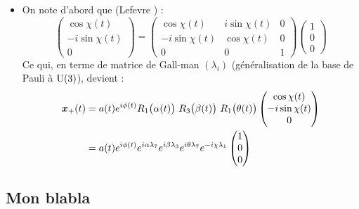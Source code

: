 \begin{itemize}
	\item On note d'abord que (Lefevre \cite{lefevre_polarization_2021}) :
	\[\begin{pmatrix}
		\cos\chi(t) \\ -i\sin\chi(t) \\ 0
	\end{pmatrix} = \begin{pmatrix}
		\cos\chi(t) & i\sin\chi(t) & 0 \\ -i\sin\chi(t) & \cos\chi(t) & 0 \\ 0 & 0 & 1
	\end{pmatrix}\begin{pmatrix}
		1 \\ 0 \\ 0
	\end{pmatrix}\]
	Ce qui, en terme de matrice de Gall-man $(\lambda_i)$ (généralisation de la base de Pauli à $\text{\normalfont U}(3)$), devient :
	\begin{align*}
		\sa{\bf{x}}(t) &= a(t)e^{i\phi(t)} R_1\big(\alpha(t)\big)\ R_3\big(\beta(t)\big)\ R_1\big(\theta(t)\big)\begin{pmatrix}
			\cos\chi(t) \\ -i\sin\chi(t) \\ 0
		\end{pmatrix} \\
		&= a(t)e^{i\phi(t)} e^{i\alpha \lambda_7} e^{i\beta \lambda_3} e^{i\theta \lambda_7} e^{-i\chi \lambda_1}\begin{pmatrix}
			1 \\ 0 \\ 0
		\end{pmatrix}
	\end{align*}
\end{itemize}



\subsection{Mon blabla}\label{subsec:blabla}


